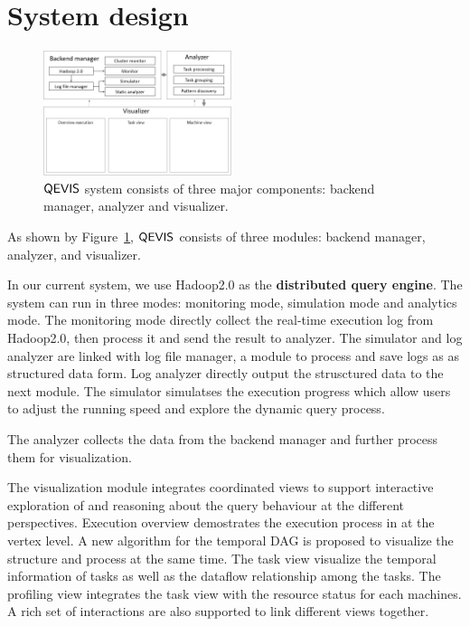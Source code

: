 \section{System design}
\begin{figure}[t]
	\centering
	\includegraphics[width=0.49\textwidth]{figures/system/sysdesign.png}
	\vspace{-3mm}
	\caption{$\mathsf{QEVIS}$ system consists of three major components: backend manager, analyzer and visualizer.}
	\label{fig:sysdesign}
	\vspace{-3mm}
\end{figure}
As shown by Figure~\ref{fig:sysdesign}, $\mathsf{QEVIS}$ consists of three modules: backend manager, analyzer, and visualizer. 

In our current system, we use Hadoop2.0 as the\textbf{ distributed query engine}. The system can run in three modes: monitoring mode, simulation mode and analytics mode. The monitoring mode directly collect the real-time execution log from Hadoop2.0, then process it and send the result to analyzer. The simulator and log analyzer are linked with log file manager, a module to process and save logs as as structured data form. Log analyzer directly output the strusctured data to the next module. The simulator simulatses the execution progress which allow users to adjust the running speed and explore the dynamic query process. 

The analyzer collects the data from the backend manager and further process them for visualization. 

The visualization module integrates coordinated views to support interactive exploration of and reasoning about the query behaviour at the different perspectives. Execution overview demostrates the execution process in at the vertex level. A new algorithm for the temporal DAG is proposed to visualize the structure and process at the same time. The task view visualize the temporal information of tasks as well as the dataflow relationship among the tasks. The profiling view integrates the task view with the resource status for each machines.  A rich set of interactions are also supported to link different views together.


